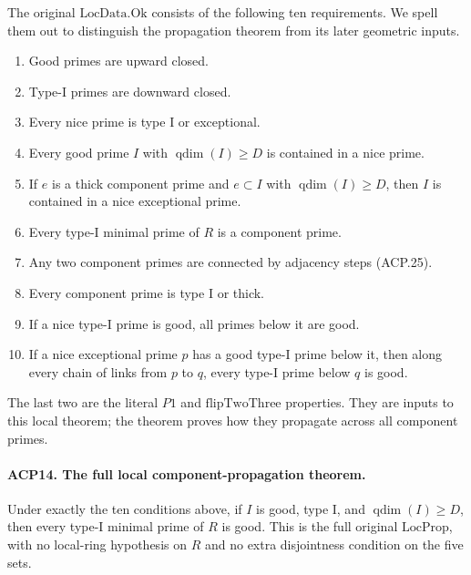 \documentclass[11pt,a4paper]{article}
\numberwithin{equation}{section}
\theoremstyle{remark}\newtheorem{remark}[theorem]{Remark}
\begin{document}
The original \(\mathrm{LocData.Ok}\) consists of the following
ten requirements.  We spell them out to distinguish the
propagation theorem from its later geometric inputs.
\begin{enumerate}
\item Good primes are upward closed.
\item Type-I primes are downward closed.
\item Every nice prime is type I or exceptional.
\item Every good prime \(I\) with \(\operatorname{qdim}(I)\ge D\)
      is contained in a nice prime.
\item If \(e\) is a thick component prime and
      \(e\subset I\) with \(\operatorname{qdim}(I)\ge D\),
      then \(I\) is contained in a nice exceptional prime.
\item Every type-I minimal prime of \(R\) is a component prime.
\item Any two component primes are connected by adjacency steps
      (ACP.25).
\item Every component prime is type I or thick.
\item If a nice type-I prime is good, all primes below it are good.
\item If a nice exceptional prime \(p\) has a good type-I prime
      below it, then along every chain of links from \(p\) to
      \(q\), every type-I prime below \(q\) is good.
\end{enumerate}
The last two are the literal \(P1\) and
\(\mathrm{flipTwoThree}\) properties.  They are inputs to
this local theorem; the theorem proves how they propagate across
all component primes.

\paragraph{ACP14. The full local component-propagation theorem.}
\label{claim:ACP14}
Under exactly the ten conditions above, if \(I\) is good,
type I, and \(\operatorname{qdim}(I)\ge D\), then every
type-I minimal prime of \(R\) is good.  This is the full
original \(\mathrm{LocProp}\), with no local-ring hypothesis
on \(R\) and no extra disjointness condition on the five sets.
\end{document}
